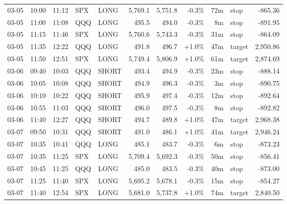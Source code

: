 \documentclass[11pt,a4paper,twoside]{article}
\begin{document}
\begin{center}
\begin{longtable}{>{\color{txtmain}}l l l l l r r r r >{\color{txtmain}}l r}
03-05 & 10:00 & 11:12 & SPX & LONG & 5,769.1 & 5,751.8 & \textcolor{lossred}{-0.3\%} & 72m & stop & \textcolor{lossred}{-865.36} \\
03-05 & 11:00 & 11:08 & QQQ & LONG & 495.5 & 494.0 & \textcolor{lossred}{-0.3\%} & 8m & stop & \textcolor{lossred}{-891.95} \\
03-05 & 11:15 & 11:46 & SPX & LONG & 5,760.6 & 5,743.3 & \textcolor{lossred}{-0.3\%} & 31m & stop & \textcolor{lossred}{-864.09} \\
03-05 & 11:35 & 12:22 & QQQ & LONG & 491.8 & 496.7 & \textcolor{wingreen}{+1.0\%} & 47m & target & \textcolor{wingreen}{2,950.86} \\
03-05 & 11:50 & 12:51 & SPX & LONG & 5,749.4 & 5,806.9 & \textcolor{wingreen}{+1.0\%} & 61m & target & \textcolor{wingreen}{2,874.69} \\
03-06 & 09:40 & 10:03 & QQQ & SHORT & 493.4 & 494.9 & \textcolor{lossred}{-0.3\%} & 23m & stop & \textcolor{lossred}{-888.14} \\
03-06 & 10:05 & 10:08 & QQQ & SHORT & 494.9 & 496.3 & \textcolor{lossred}{-0.3\%} & 3m & stop & \textcolor{lossred}{-890.75} \\
03-06 & 10:10 & 10:22 & QQQ & SHORT & 495.9 & 497.4 & \textcolor{lossred}{-0.3\%} & 12m & stop & \textcolor{lossred}{-892.64} \\
03-06 & 10:55 & 11:03 & QQQ & SHORT & 496.0 & 497.5 & \textcolor{lossred}{-0.3\%} & 8m & stop & \textcolor{lossred}{-892.82} \\
03-06 & 11:40 & 12:27 & QQQ & SHORT & 494.7 & 489.8 & \textcolor{wingreen}{+1.0\%} & 47m & target & \textcolor{wingreen}{2,968.38} \\
03-07 & 09:50 & 10:31 & QQQ & SHORT & 491.0 & 486.1 & \textcolor{wingreen}{+1.0\%} & 41m & target & \textcolor{wingreen}{2,946.24} \\
03-07 & 10:35 & 10:41 & QQQ & LONG & 485.1 & 483.7 & \textcolor{lossred}{-0.3\%} & 6m & stop & \textcolor{lossred}{-873.23} \\
03-07 & 10:35 & 11:25 & SPX & LONG & 5,709.4 & 5,692.3 & \textcolor{lossred}{-0.3\%} & 50m & stop & \textcolor{lossred}{-856.41} \\
03-07 & 10:45 & 11:25 & QQQ & LONG & 485.0 & 483.5 & \textcolor{lossred}{-0.3\%} & 40m & stop & \textcolor{lossred}{-873.00} \\
03-07 & 11:25 & 11:40 & SPX & LONG & 5,695.2 & 5,678.1 & \textcolor{lossred}{-0.3\%} & 15m & stop & \textcolor{lossred}{-854.27} \\
03-07 & 11:40 & 12:54 & SPX & LONG & 5,681.0 & 5,737.8 & \textcolor{wingreen}{+1.0\%} & 74m & target & \textcolor{wingreen}{2,840.50} \\

\end{longtable}
\end{center}
\end{document}
